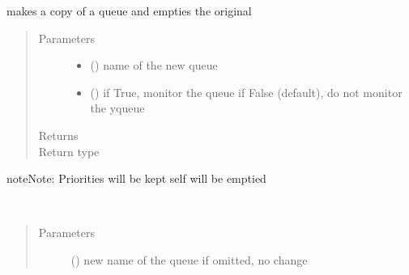 \documentclass[letterpaper,10pt,english]{sphinxmanual}
\begin{document}
\begin{fulllineitems}
\begin{fulllineitems}
\end{fulllineitems}


\begin{fulllineitems}
\label{\detokenize{Reference:salabim.Queue.move}}
makes a copy of a queue and empties the original
\begin{quote}\begin{description}
\item[{Parameters}] \leavevmode\begin{itemize}
\item {} 
 () \textendash{} name of the new queue

\item {} 
 () \textendash{} if True, monitor the queue 
if False (default), do not monitor the yqueue

\end{itemize}

\item[{Returns}] \leavevmode
{}

\item[{Return type}] \leavevmode
{\hyperref[\detokenize{Reference:salabim.Queue}]{}}

\end{description}\end{quote}

\begin{sphinxadmonition}{note}{Note:}
Priorities will be kept 
self will be emptied
\end{sphinxadmonition}

\end{fulllineitems}


\begin{fulllineitems}
\label{\detokenize{Reference:salabim.Queue.name}}~\begin{quote}\begin{description}
\item[{Parameters}] \leavevmode
{} () \textendash{} new name of the queue
if omitted, no change


\end{description}
\end{quote}
\end{fulllineitems}
\end{fulllineitems}
\end{document}
